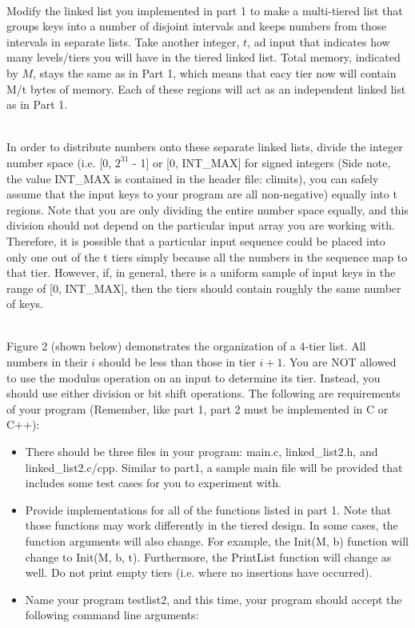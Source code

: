 \documentclass[12pt]{extarticle}
\newenvironment{myindentpar}[1]%
 {\begin{list}{}%
         {\setlength{\leftmargin}{#1}}%
         \item[]%
 }
 {\end{list}}
\begin{document}
\begin{myindentpar}{6.5mm}
    \ \\
    Modify the linked list you implemented in part 1 to make a multi-tiered list that groups keys into a number of disjoint intervals and keeps numbers from those intervals in separate lists.  Take another integer, $t$, ad input that indicates how many levels/tiers you will have in the tiered linked list.  Total memory, indicated by $M$, stays the same as in Part 1, which means that eacy tier now will contain M/t bytes of memory.  Each of these regions will act as an independent linked list as in Part 1.  
    
    \ \\
    In order to distribute numbers onto these separate linked lists, divide the integer number space (i.e. [0, $2^{31}$ - 1] or [0, INT\_MAX] for signed integers (Side note, the value INT\_MAX is contained in the header file: climits), you can safely assume that the input keys to your program are all non-negative) equally into t regions.  Note that you are only dividing the entire number space equally, and this division should not depend on the particular input array you are working with.  Therefore, it is possible that a particular input sequence could be placed into only one out of the t tiers simply because all the numbers in the sequence map to that tier.  However, if, in general, there is a uniform sample of input keys in the range of [0, INT\_MAX], then the tiers should contain roughly the same number of keys.  
    
    \ \\
    Figure 2 (shown below) demonstrates the organization of a 4-tier list.  All numbers in their $i$ should be less than those in tier $i + 1$.  You are NOT allowed to use the modulus operation on an input to determine its tier.  Instead, you should use either division or bit shift operations. The following are requirements of your program (Remember, like part 1, part 2 must be implemented in C or C++):
    
    \begin{itemize}
        \setlength\itemsep{-0.1em}

        \item There should be three files in your program: main.c, linked\_list2.h, and linked\_list2.c/cpp.  Similar to part1, a sample main file will be provided that includes some test cases for you to experiment with.  
        \item Provide implementations for all of the functions listed in part 1.  Note that those functions may work differently in the tiered design.  In some cases, the function arguments will also change.  For example, the Init(M, b) function will change to Init(M, b, t).  Furthermore, the PrintList function will change as well.  Do not print empty tiers (i.e. where no insertions have occurred).  
        \item Name your program testlist2, and this time, your program should accept the following command line arguments:
        

\end{itemize}
\end{myindentpar}
\end{document}
